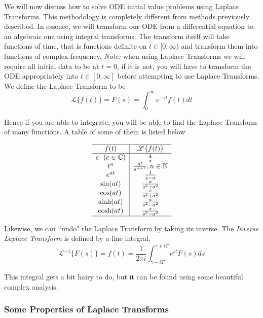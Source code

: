 We will now discuss how to solve ODE initial value problems using Laplace Transforms. This methodology is completely different from methods previously described. In essence, we will transform our ODE from a differential equation to an algebraic one using integral transforms. The transform itself will take functions of time, that is functions definite on $t\in[0,\infty)$ and transform them into functions of complex frequency. \emph{Note:} when using Laplace Transforms we will require all initial data to be at $t=0$, if it is not, you will have to transform the ODE appropriately into $t\in[0,\infty]$ before attempting to use Laplace Transforms.\\

We define the Laplace Transform to be
\begin{equation}
\label{laplace_transform} \mathscr{L}\{ f(t) \} = F(s) = \int_0^{\infty} e^{-st } f(t) dt
\end{equation}

Hence if you are able to integrate, you will be able to find the Laplace Transform of many functions. A table of some of them is listed below

$$\begin{array}{c|c}
\hline
f(t) & \mathscr{L} \{ f(t) \} \\ 
\hline 
c \ \ (c\in\mathbb{C}) & \frac{1}{s} \\
t^n & \frac{n!}{s^{n+1}}, n\in\mathbb{N} \\
e^{at} & \frac{1}{s-a} \\
\sin(at) & \frac{a}{s^2+a^2} \\
\cos(at) & \frac{s}{s^2+a^2} \\
\sinh(at) & \frac{a}{s^2-a^2} \\
\cosh(at) & \frac{s}{s^2-a^2} \\
\hline
\end{array}$$

Likewise, we can ``undo" the Laplace Transform by taking its inverse. The \emph{Inverse Laplace Transform} is defined by a line integral,
\begin{equation}
\label{inverse_laplace_transform} \mathscr{L}^{-1}\{F(s)\} = f(t) = \frac{1}{2\pi i} \int_{\gamma-iT}^{\gamma+iT} e^{st} F(s) ds
\end{equation}

This integral gets a bit hairy to do, but it can be found using some beautiful complex analysis.

%
%
%
%
\subsubsection{Some Properties of Laplace Transforms}


